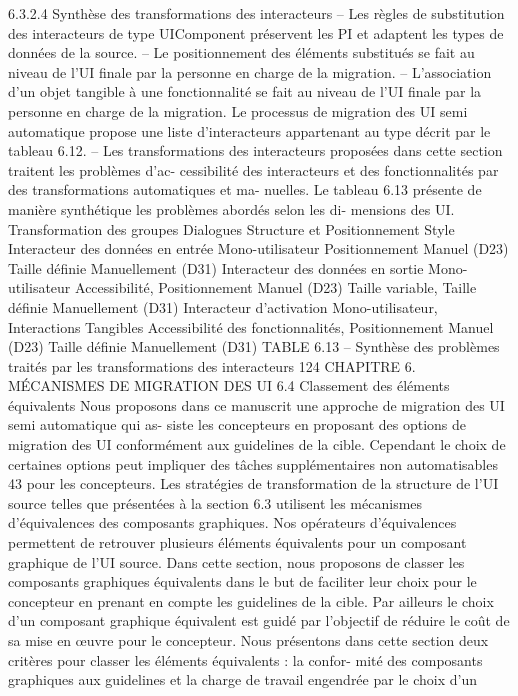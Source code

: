 \documentclass{article}
\begin{document}
6.3.2.4
Synthèse des transformations des interacteurs
– Les règles de substitution des interacteurs de type UIComponent préservent les PI et adaptent
les types de données de la source.
– Le positionnement des éléments substitués se fait au niveau de l’UI ﬁnale par la personne en
charge de la migration.
– L’association d’un objet tangible à une fonctionnalité se fait au niveau de l’UI ﬁnale par la
personne en charge de la migration. Le processus de migration des UI semi automatique propose
une liste d’interacteurs appartenant au type décrit par le tableau 6.12.
– Les transformations des interacteurs proposées dans cette section traitent les problèmes d’ac-
cessibilité des interacteurs et des fonctionnalités par des transformations automatiques et ma-
nuelles. Le tableau 6.13 présente de manière synthétique les problèmes abordés selon les di-
mensions des UI.
Transformation des
groupes
Dialogues
Structure et
Positionnement
Style
Interacteur des
données en entrée
Mono-utilisateur
Positionnement
Manuel (D23)
Taille déﬁnie
Manuellement (D31)
Interacteur des
données en sortie
Mono-utilisateur
Accessibilité,
Positionnement
Manuel (D23)
Taille variable, Taille
déﬁnie Manuellement
(D31)
Interacteur
d’activation
Mono-utilisateur,
Interactions Tangibles
Accessibilité des
fonctionnalités,
Positionnement
Manuel (D23)
Taille déﬁnie
Manuellement (D31)
TABLE 6.13 – Synthèse des problèmes traités par les transformations des interacteurs
124
CHAPITRE 6. MÉCANISMES DE MIGRATION DES UI
6.4
Classement des éléments équivalents
Nous proposons dans ce manuscrit une approche de migration des UI semi automatique qui as-
siste les concepteurs en proposant des options de migration des UI conformément aux guidelines
de la cible. Cependant le choix de certaines options peut impliquer des tâches supplémentaires non
automatisables 43 pour les concepteurs.
Les stratégies de transformation de la structure de l’UI source telles que présentées à la section 6.3
utilisent les mécanismes d’équivalences des composants graphiques. Nos opérateurs d’équivalences
permettent de retrouver plusieurs éléments équivalents pour un composant graphique de l’UI source.
Dans cette section, nous proposons de classer les composants graphiques équivalents dans le but de
faciliter leur choix pour le concepteur en prenant en compte les guidelines de la cible. Par ailleurs le
choix d’un composant graphique équivalent est guidé par l’objectif de réduire le coût de sa mise en
œuvre pour le concepteur.
Nous présentons dans cette section deux critères pour classer les éléments équivalents : la confor-
mité des composants graphiques aux guidelines et la charge de travail engendrée par le choix d’un
\end{document}
